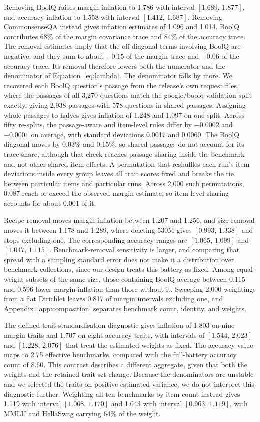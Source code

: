 \documentclass{article}
\newcommand{\ci}[2]{\ensuremath{[#1,\,#2]}}
\begin{document}
Removing BoolQ raises margin inflation to 1.786 with interval \ci{1.689}{1.877}, and accuracy inflation to 1.558 with interval \ci{1.412}{1.687}. Removing CommonsenseQA instead gives inflation estimates of 1.096 and 1.014. BoolQ contributes 68\% of the margin covariance trace and 84\% of the accuracy trace. The removal estimates imply that the off-diagonal terms involving BoolQ are negative, and they sum to about $-0.15$ of the margin trace and $-0.06$ of the accuracy trace. Its removal therefore lowers both the numerator and the denominator of Equation~\ref{eq:lambda}. The denominator falls by more. We recovered each BoolQ question's passage from the release's own request files, where the passages of all 3,270 questions match the google/boolq validation split exactly, giving 2,938 passages with 578 questions in shared passages. Assigning whole passages to halves gives inflation of 1.248 and 1.097 on one split. Across fifty re-splits, the passage-aware and item-level rules differ by $-0.0002$ and $-0.0001$ on average, with standard deviations 0.0017 and 0.0060. The BoolQ diagonal moves by 0.03\% and 0.15\%, so shared passages do not account for its trace share, although that check reaches passage sharing inside the benchmark and not other shared item effects. A permutation that reshuffles each run's item deviations inside every group leaves all trait scores fixed and breaks the tie between particular items and particular runs. Across 2,000 such permutations, 0.087 reach or exceed the observed margin estimate, so item-level sharing accounts for about 0.001 of it.

Recipe removal moves margin inflation between 1.207 and 1.256, and size removal moves it between 1.178 and 1.289, where deleting 530M gives \ci{0.993}{1.338} and stops excluding one. The corresponding accuracy ranges are \ci{1.065}{1.099} and \ci{1.047}{1.115}. Benchmark-removal sensitivity is larger, and comparing that spread with a sampling standard error does not make it a distribution over benchmark collections, since our design treats this battery as fixed. Among equal-weight subsets of the same size, those containing BoolQ average between 0.115 and 0.596 lower margin inflation than those without it. Sweeping 2,000 weightings from a flat Dirichlet leaves 0.817 of margin intervals excluding one, and Appendix~\ref{app:composition} separates benchmark count, identity, and weights.

The defined-trait standardisation diagnostic gives inflation of 1.803 on nine margin traits and 1.707 on eight accuracy traits, with intervals of \ci{1.544}{2.023} and \ci{1.228}{2.076} that treat the estimated weights as fixed. The accuracy value maps to 2.75 effective benchmarks, compared with the full-battery accuracy count of 8.60. This contrast describes a different aggregate, given that both the weights and the retained trait set change. Because the denominators are unstable and we selected the traits on positive estimated variance, we do not interpret this diagnostic further. Weighting all ten benchmarks by item count instead gives 1.119 with interval \ci{1.068}{1.170} and 1.043 with interval \ci{0.963}{1.119}, with MMLU and HellaSwag carrying 64\% of the weight.
\end{document}
